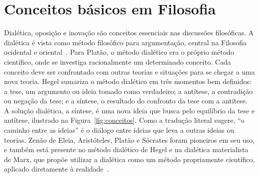 \section{Conceitos básicos em Filosofia}
\label{sec:fund:filosofia}

Dialética, oposição e inovação são conceitos essenciais nas discussões
filosóficas. A dialética é vista como método filosófico para
argumentação, central na Filosofia ocidental e
oriental~\cite{deleuze,pinto,van}. Para Platão, o método dialético era
o próprio método científico, onde se investiga racionalmente um
determinado conceito. Cada conceito deve ser confrontado com outras
teorias e situações para se chegar a uma nova teoria. Hegel sumariza o
método dialético em três momentos bem definidos: a tese, um argumento
ou ideia tomado como verdadeiro; a antítese, a contradição ou negação
da tese; e a síntese, o resultado do confronto da tese com a
antítese. A solução dialética, a síntese, é uma nova ideia que busca
pelo equilíbrio da tese e antítese, ilustrado na
Figura~\ref{fig:conceitos}. Como a tradução literal sugere, ``o
caminho entre as ideias'' é o diálogo entre ideias que leva a outras
ideias ou teorias. Zenão de Eleia, Aristóteles, Platão e Sócrates
foram pioneiros em seu uso, e também está presente no método dialético
de Hegel e na dialética materialista de Marx, que propõe utilizar a
dialética como um método propriamente científico, aplicado diretamente
à realidade~\cite{dialectics}.


